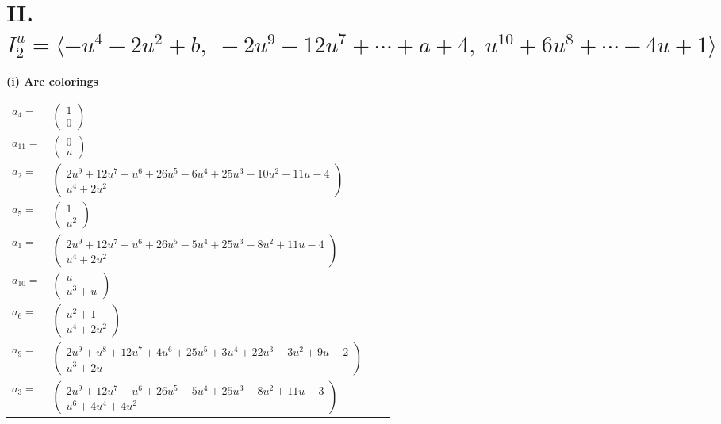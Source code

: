 \documentclass[1p]{elsarticle_modified}
\theoremstyle{definition}
\begin{document}
\centering \section*{II. $I^u_{2}= \langle - u^4-2 u^2+b,\;-2 u^9-12 u^7+\cdots+a+4,\;u^{10}+6 u^8+\cdots-4 u+1 \rangle$}
\flushleft \textbf{(i) Arc colorings}\\
\begin{tabular}{m{7pt} m{180pt} m{7pt} m{180pt} }
\flushright $a_{4}=$&$\begin{pmatrix}1\\0\end{pmatrix}$ \\
\flushright $a_{11}=$&$\begin{pmatrix}0\\u\end{pmatrix}$ \\
\flushright $a_{2}=$&$\begin{pmatrix}2 u^9+12 u^7- u^6+26 u^5-6 u^4+25 u^3-10 u^2+11 u-4\\u^4+2 u^2\end{pmatrix}$ \\
\flushright $a_{5}=$&$\begin{pmatrix}1\\u^2\end{pmatrix}$ \\
\flushright $a_{1}=$&$\begin{pmatrix}2 u^9+12 u^7- u^6+26 u^5-5 u^4+25 u^3-8 u^2+11 u-4\\u^4+2 u^2\end{pmatrix}$ \\
\flushright $a_{10}=$&$\begin{pmatrix}u\\u^3+u\end{pmatrix}$ \\
\flushright $a_{6}=$&$\begin{pmatrix}u^2+1\\u^4+2 u^2\end{pmatrix}$ \\
\flushright $a_{9}=$&$\begin{pmatrix}2 u^9+u^8+12 u^7+4 u^6+25 u^5+3 u^4+22 u^3-3 u^2+9 u-2\\u^3+2 u\end{pmatrix}$ \\
\flushright $a_{3}=$&$\begin{pmatrix}2 u^9+12 u^7- u^6+26 u^5-5 u^4+25 u^3-8 u^2+11 u-3\\u^6+4 u^4+4 u^2\end{pmatrix}$ \\

\end{tabular}
\end{document}
